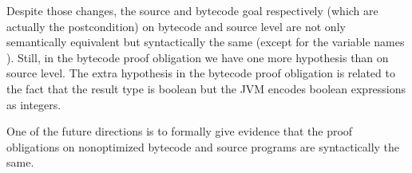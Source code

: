 Despite those changes, the source and bytecode goal respectively (which are actually the postcondition) on bytecode and source level are not only
semantically equivalent but syntactically the same (except for the variable names ). Still, in the bytecode proof obligation we have one more hypothesis than on source level. The extra hypothesis in the bytecode proof obligation is related to the fact that the result type is boolean but the JVM encodes boolean expressions as integers.


One of the future directions is to formally give evidence that the proof obligations on nonoptimized bytecode and source programs are syntactically the same. 
\clearpage





%
%
%
%
%
%
%
%
%

